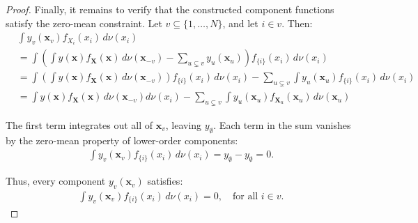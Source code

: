 \begin{proof}
Finally, it remains to verify that the constructed component functions satisfy the zero-mean constraint. Let \( v \subseteq \{1, \ldots, N\} \), and let \( i \in v \). Then:
\begin{align*}
    &\int y_v(\boldsymbol{x}_v) f_{X_i}(x_i) \, d\nu(x_i) \\[0.5em]
    &= \int \left( \int y(\boldsymbol{x}) f_{\boldsymbol{X}}(\boldsymbol{x}) \, d\nu(\boldsymbol{x}_{-v}) - \sum_{u \subsetneq v} y_u(\boldsymbol{x}_u) \right) f_{\{i\}}(x_i) \, d\nu(x_i) \\[0.5em]
    &= \int \left( \int y(\boldsymbol{x}) f_{\boldsymbol{X}}(\boldsymbol{x}) \, d\nu(\boldsymbol{x}_{-v}) \right) f_{\{i\}}(x_i) \, d\nu(x_i) 
    - \sum_{u \subsetneq v} \int y_u(\boldsymbol{x}_u) f_{\{i\}}(x_i) \, d\nu(x_i) \\[0.5em]
    &= \int y(\boldsymbol{x}) f_{\boldsymbol{X}}(\boldsymbol{x}) \, d\nu(\boldsymbol{x}_{-v}) d\nu(x_i)
    - \sum_{u \subsetneq v} \int y_u(\boldsymbol{x}_u) f_{\boldsymbol{X}_u}(\boldsymbol{x}_u) \, d\nu(\boldsymbol{x}_u)
\end{align*}

The first term integrates out all of \( \boldsymbol{x}_v \), leaving \( y_{\emptyset} \). Each term in the sum vanishes by the zero-mean property of lower-order components:
\begin{align*}
    \int y_v(\boldsymbol{x}_v) f_{\{i\}}(x_i) \, d\nu(x_i) = y_{\emptyset} - y_{\emptyset} = 0.
\end{align*}

Thus, every component \( y_v(\boldsymbol{x}_v) \) satisfies:
\begin{align*}
    \int y_v(\boldsymbol{x}_v) f_{\{i\}}(x_i) \, d\nu(x_i) = 0, \quad \text{for all } i \in v.
\end{align*}
\end{proof}

